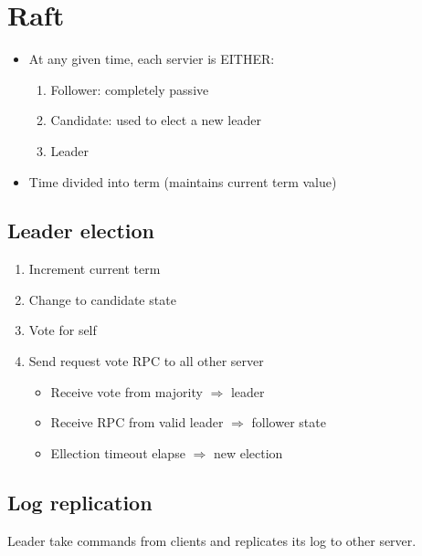 \section{Raft}

\begin{itemize}
    \item At any given time, each servier is EITHER:
        \begin{enumerate}
            \item Follower: completely passive
            \item Candidate: used to elect a new leader
            \item Leader
        \end{enumerate}
    \item Time divided into term (maintains current term value)
\end{itemize}

\subsection{Leader election}
\begin{enumerate}
    \item Increment current term
    \item Change to candidate state
    \item Vote for self
    \item Send request vote RPC to all other server
        \begin{itemize}
            \item Receive vote from majority $\Rightarrow$ leader
            \item Receive RPC from valid leader $\Rightarrow$ follower state
            \item Ellection timeout elapse $\Rightarrow$ new election
        \end{itemize}
\end{enumerate}

\subsection{Log replication}
Leader take commands from clients and replicates its log to other server.
